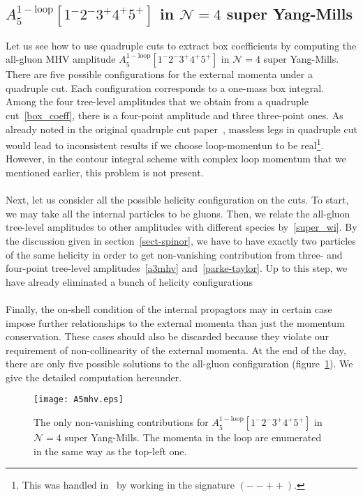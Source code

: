 \subsection*{$A_5^{\mathrm{1-loop}}[1^-2^-3^+4^+5^+]$ in $\mathcal{N}=4$ super Yang-Mills}\label{sect-a5mhv}
Let us see how to use quadruple cuts to extract box coefficients by computing the all-gluon MHV amplitude $A_5^{\mathrm{1-loop}}[1^-2^-3^+4^+5^+]$ in $\mathcal{N}=4$ super Yang-Mills. 
There are five possible configurations for the external momenta under a quadruple cut.
Each configuration corresponds to a one-mass box integral.
Among the four tree-level amplitudes that we obtain from a quadruple cut~\cref{box_coeff}, there is a four-point amplitude and three three-point ones.
As already noted in the original quadruple cut paper~\cite{Britto:2004nc}, massless legs in quadruple cut would lead to inconsistent results if we choose loop-momentun to be real\footnote{This was handled in~\cite{Britto:2004nc} by working in the signature $(--++)$.}. 
However, in the contour integral scheme with complex loop momentum that we mentioned earlier, this problem is not present.
\\\\
Next, let us consider all the possible helicity configuration on the cuts.
To start, we may take all the internal particles to be gluons. 
Then, we relate the all-gluon tree-level amplitudes to other amplitudes with different species by~\cref{super_wi}. 
By the discussion given in section~\ref{sect-spinor}, we have to have exactly two particles of the same helicity in order to get non-vanishing contribution from three- and four-point tree-level amplitudes~\cref{a3mhv} and~\cref{parke-taylor}.
Up to this step, we have already eliminated a bunch of helicity configurations
\\\\
Finally, the on-shell condition of the internal propagtors may in certain case impose further relationships to the external momenta than just the momentum conservation.
These cases should also be discarded because they violate our requirement of non-collinearity of the external momenta. 
At the end of the day, there are only five possible solutions to the all-gluon configuration (figure~\ref{fig-a5mhv}).
We give the detailed computation hereunder.
\begin{figure}
  \centering
  \texttt{[image: A5mhv.eps]}
  \caption{The only non-vanishing contributions for $A_5^{\mathrm{1-loop}}[1^-2^-3^+4^+5^+]$ in $\mathcal{N}=4$ super Yang-Mills. The momenta in the loop are enumerated in the same way as the top-left one.}
  \label{fig-a5mhv}
\end{figure}

